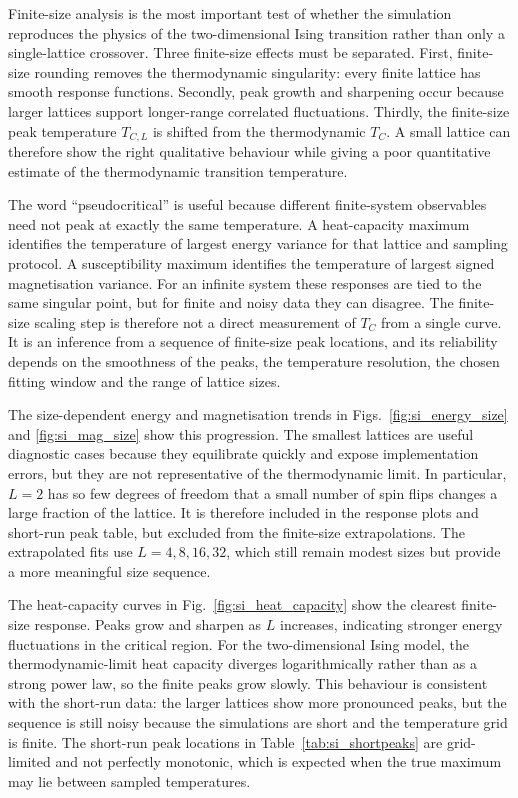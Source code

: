 \documentclass[twoside,twocolumn,9pt]{extarticle}
\begin{document}
Finite-size analysis is the most important test of whether the simulation reproduces the physics of the two-dimensional Ising transition rather than only a single-lattice crossover. Three finite-size effects must be separated. First, finite-size rounding removes the thermodynamic singularity: every finite lattice has smooth response functions. Secondly, peak growth and sharpening occur because larger lattices support longer-range correlated fluctuations. Thirdly, the finite-size peak temperature \(T_{C,L}\) is shifted from the thermodynamic \(T_C\). A small lattice can therefore show the right qualitative behaviour while giving a poor quantitative estimate of the thermodynamic transition temperature.

The word ``pseudocritical'' is useful because different finite-system observables need not peak at exactly the same temperature. A heat-capacity maximum identifies the temperature of largest energy variance for that lattice and sampling protocol. A susceptibility maximum identifies the temperature of largest signed magnetisation variance. For an infinite system these responses are tied to the same singular point, but for finite and noisy data they can disagree. The finite-size scaling step is therefore not a direct measurement of \(T_C\) from a single curve. It is an inference from a sequence of finite-size peak locations, and its reliability depends on the smoothness of the peaks, the temperature resolution, the chosen fitting window and the range of lattice sizes.

The size-dependent energy and magnetisation trends in Figs.~\ref{fig:si_energy_size} and \ref{fig:si_mag_size} show this progression. The smallest lattices are useful diagnostic cases because they equilibrate quickly and expose implementation errors, but they are not representative of the thermodynamic limit. In particular, \(L=2\) has so few degrees of freedom that a small number of spin flips changes a large fraction of the lattice. It is therefore included in the response plots and short-run peak table, but excluded from the finite-size extrapolations. The extrapolated fits use \(L=4,8,16,32\), which still remain modest sizes but provide a more meaningful size sequence.

The heat-capacity curves in Fig.~\ref{fig:si_heat_capacity} show the clearest finite-size response. Peaks grow and sharpen as \(L\) increases, indicating stronger energy fluctuations in the critical region. For the two-dimensional Ising model, the thermodynamic-limit heat capacity diverges logarithmically rather than as a strong power law,\cite{onsager1944,ferdinand1969} so the finite peaks grow slowly. This behaviour is consistent with the short-run data: the larger lattices show more pronounced peaks, but the sequence is still noisy because the simulations are short and the temperature grid is finite. The short-run peak locations in Table~\ref{tab:si_shortpeaks} are grid-limited and not perfectly monotonic, which is expected when the true maximum may lie between sampled temperatures.
\end{document}
